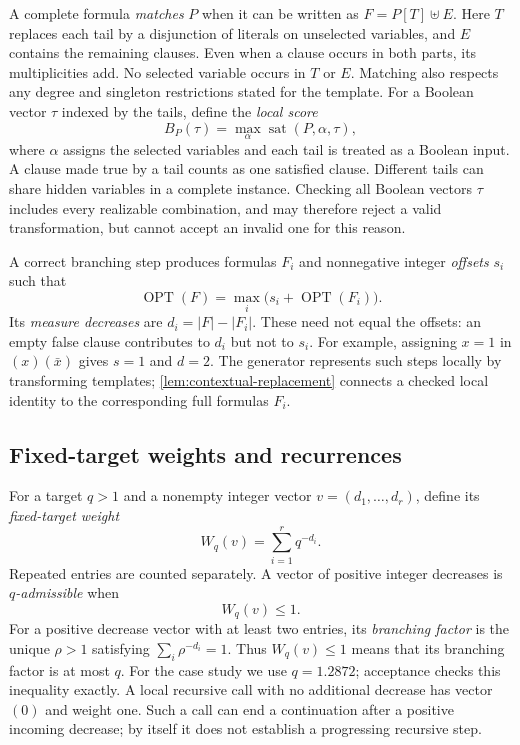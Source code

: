 \documentclass[10pt,twoside]{article}
\newcommand{\OPT}{\operatorname{OPT}}
\theoremstyle{definition}
\theoremstyle{remark}
\begin{document}
A complete formula \emph{matches} $P$ when it can be written as
$F=P[T]\uplus E$. Here $T$ replaces each tail by a disjunction of literals
on unselected variables, and $E$ contains the remaining clauses.
Even when a clause occurs in both parts, its multiplicities add.
No selected variable occurs in $T$ or $E$. Matching also
respects any degree and singleton restrictions stated for the template.
For a Boolean vector $\tau$ indexed by the tails, define the \emph{local
score}
\begin{equation}
 B_P(\tau)=\max_{\alpha}\operatorname{sat}(P,\alpha,\tau),
 \label{eq:local-score}
\end{equation}
where $\alpha$ assigns the selected variables and each tail is treated as a
Boolean input. A clause made true by a tail counts as one satisfied clause.
Different tails can share hidden variables in a complete instance. Checking
all Boolean vectors $\tau$ includes every realizable combination, and may
therefore reject a valid transformation, but cannot accept an invalid one for
this reason.

A correct branching step produces formulas $F_i$ and nonnegative integer
\emph{offsets} $s_i$ such that
\[
  \OPT(F)=\max_i\bigl(s_i+\OPT(F_i)\bigr).
\]
Its \emph{measure decreases} are $d_i=|F|-|F_i|$. These need not equal the
offsets: an empty false clause contributes to $d_i$ but not to $s_i$.
For example, assigning $x=1$ in $(x)(\bar x)$ gives $s=1$ and $d=2$.
The generator represents such steps locally by transforming templates;
\cref{lem:contextual-replacement} connects a checked local identity to the
corresponding full formulas $F_i$.

\subsection{Fixed-target weights and recurrences}
\label{sec:weights}

For a target $q>1$ and a nonempty integer vector $v=(d_1,\ldots,d_r)$,
define its \emph{fixed-target weight}
\begin{equation}
 W_q(v)=\sum_{i=1}^{r}q^{-d_i}.
 \label{eq:weight}
\end{equation}
Repeated entries are counted separately. A vector of positive integer
decreases is \emph{$q$-admissible} when
\begin{equation}
  W_q(v)\le 1.
  \label{eq:target}
\end{equation}
For a positive decrease vector with at least two entries, its
\emph{branching factor} is the unique $\rho>1$ satisfying
$\sum_i\rho^{-d_i}=1$. Thus $W_q(v)\le1$ means that its branching factor
is at most $q$.
For the case study we use $q=1.2872$; acceptance checks this inequality
exactly. A local recursive call with no additional decrease has vector $(0)$
and weight one. Such a call can end a continuation after a positive incoming
decrease; by itself it does not establish a progressing recursive step.
\end{document}
